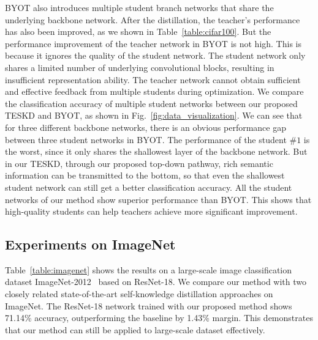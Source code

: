 \documentclass[letterpaper]{article} %
\begin{document}
BYOT also introduces multiple student branch networks that share the underlying backbone network. After the distillation, the teacher's performance has also been improved, as we shown in Table~\ref{table:cifar100}. But the performance improvement of the teacher network in BYOT is not high. This is because it ignores the quality of the student network. The student network only shares a limited number of underlying convolutional blocks, resulting in insufficient representation ability. The teacher network cannot obtain sufficient and effective feedback from multiple students during optimization. We compare the classification accuracy of multiple student networks between our proposed TESKD and BYOT, as shown in Fig.~\ref{fig:data_visualization}. We can see that for three different backbone networks, there is an obvious performance gap between three student networks in BYOT. The performance of the student $\#1$ is the worst, since it only shares the shallowest layer of the backbone network. But in our TESKD, through our proposed top-down pathway, rich semantic information can be transmitted to the bottom, so that even the shallowest student network can still get a better classification accuracy. All the student networks of our method show superior performance than BYOT. This shows that high-quality students can help teachers achieve more significant improvement.


\subsection{Experiments on ImageNet}

Table~\ref{table:imagenet} shows the results on a large-scale image classification dataset ImageNet-2012~\cite{deng2009imagenet} based on ResNet-18. We compare our method with two closely related state-of-the-art self-knowledge distillation approaches on ImageNet. The ResNet-18 network trained with our proposed method shows 71.14\% accuracy, outperforming the baseline by 1.43\% margin. This demonstrates that our method can still be applied to large-scale dataset effectively.
\end{document}
